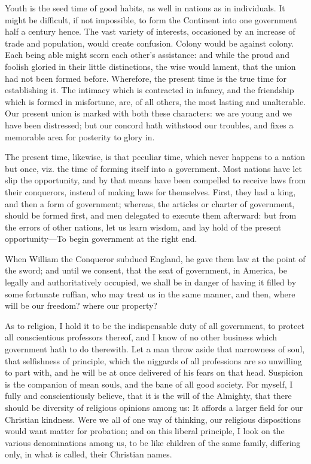\documentclass[12pt,oneside]{memoir}
\begin{document}
Youth is the seed time of good habits, as well in nations as in
individuals. It might be difficult, if not impossible, to form the
Continent into one government half a century hence. The vast variety
of interests, occasioned by an increase of trade and population,
would create confusion. Colony would be against colony. Each being
able might scorn each other's assistance: and while the proud and
foolish gloried in their little distinctions, the wise would lament,
that the union had not been formed before. Wherefore, the present
time is the true time for establishing it. The intimacy which is
contracted in infancy, and the friendship which is formed in
misfortune, are, of all others, the most lasting and unalterable.
Our present union is marked with both these characters: we are young
and we have been distressed; but our concord hath withstood our
troubles, and fixes a memorable area for posterity to glory in.

The present time, likewise, is that peculiar time, which never
happens to a nation but once, viz. the time of forming itself into a
government. Most nations have let slip the opportunity, and by that
means have been compelled to receive laws from their conquerors,
instead of making laws for themselves. First, they had a king, and
then a form of government; whereas, the articles or charter of
government, should be formed first, and men delegated to execute
them afterward: but from the errors of other nations, let us learn
wisdom, and lay hold of the present opportunity---To begin government
at the right end.

When William the Conqueror subdued England, he gave them law at the
point of the sword; and until we consent, that the seat of
government, in America, be legally and authoritatively occupied, we
shall be in danger of having it filled by some fortunate ruffian,
who may treat us in the same manner, and then, where will be our
freedom? where our property?

As to religion, I hold it to be the indispensable duty of all
government, to protect all conscientious professors thereof, and I
know of no other business which government hath to do therewith. Let
a man throw aside that narrowness of soul, that selfishness of
principle, which the niggards of all professions are so unwilling to
part with, and he will be at once delivered of his fears on that head.
Suspicion is the companion of mean souls, and the bane of all good
society. For myself, I fully and conscientiously believe, that it is
the will of the Almighty, that there should be diversity of
religious opinions among us: It affords a larger field for our
Christian kindness. Were we all of one way of thinking, our
religious dispositions would want matter for probation; and on this
liberal principle, I look on the various denominations among us, to
be like children of the same family, differing only, in what is
called, their Christian names.
\end{document}
